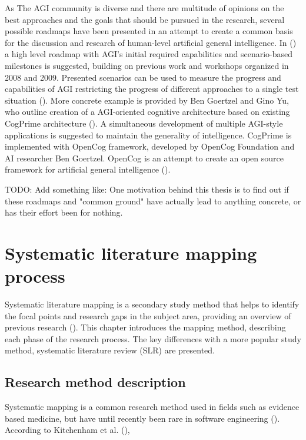 \documentclass[utf8,english]{gradu3}
\begin{document}
As The AGI community is diverse and there are multitude of opinions on the best
approaches and the goals that should be pursued in the research, several
possible roadmaps have been presented in an attempt to create a common basis for
the discussion and research of human-level artificial general intelligence. In
(\cite{adams2012}) a high level roadmap with AGI's initial required capabilities
and scenario-based milestones is suggested, building on previous work and
workshops organized in 2008 and 2009. Presented scenarios can be used to measure
the progress and capabilities of AGI restricting the progress of different
approaches to a single test situation (\cite{adams2012}). More concrete example
is provided by Ben Goertzel and Gino Yu, who outline creation of a AGI-oriented
cognitive architecture based on existing CogPrime architecture
(\cite{goertzel2014map}). A simultaneous development of multiple AGI-style
applications is suggested to maintain the generality of intelligence. CogPrime
is implemented with OpenCog framework, developed by OpenCog Foundation and AI
researcher Ben Goertzel. OpenCog is an attempt to create an open source
framework for artificial general intelligence
(\cite{opencogwiki,goertzel2012cog}).

TODO: Add something like: One motivation behind this thesis is to find out if
these roadmaps and "common ground" have actually lead to anything concrete, or
has their effort been for nothing.


\chapter{Systematic literature mapping process}


\label{method}

Systematic literature mapping is a secondary study method that helps to identify
the focal points and research gaps in the subject area, providing an overview of
previous research (\cite{petersen2008}). This chapter introduces the mapping
method, describing each phase of the research process. The key differences with
a more popular study method, systematic literature review (SLR) are presented.

\section{Research method description}


Systematic mapping is a common research method used in fields such as evidence
based medicine, but have until recently been rare in software engineering
(\cite{petersen2008}). According to Kitchenham et al. (\cite{kitchenham2010}), 
\end{document}
